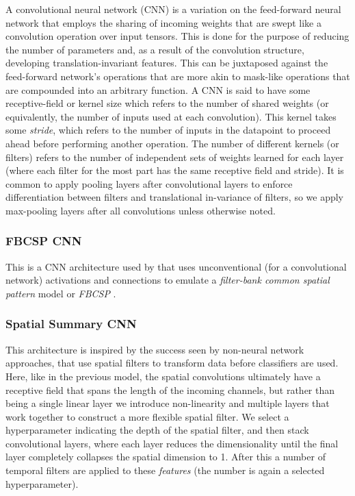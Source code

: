 \documentclass[utf8]{frontiersSCNS} %
\begin{document}
A convolutional neural network (CNN) \cite{LecunnMNIST, GoodfellowTextbook} is a variation on the feed-forward neural network that employs the sharing of incoming weights that are swept like a convolution operation over input tensors. This is done for the purpose of reducing the number of parameters and, as a result of the convolution structure, developing translation-invariant features. This can be juxtaposed against the feed-forward network's operations that are more akin to mask-like operations that are compounded into an arbitrary function. A CNN is said to have some receptive-field or kernel size which refers to the number of shared weights (or equivalently, the number of inputs used at each convolution). This kernel takes some {\em stride}, which refers to the number of inputs in the datapoint to proceed ahead before performing another operation. The number of different kernels (or filters) refers to the number of independent sets of weights learned for each layer (where each filter for the most part has the same receptive field and stride). It is common to apply pooling layers \cite{} after convolutional layers to enforce differentiation between filters and translational in-variance of filters, so we apply max-pooling \cite{} layers after all convolutions unless otherwise noted.

\subsubsection{FBCSP CNN}

This is a CNN architecture used by \cite{Schirrmeister2017} that uses unconventional (for a convolutional network) activations and connections to emulate a \emph{filter-bank common spatial pattern} model or \emph{FBCSP} \cite{KaiKengAng2008}.  

\subsubsection{Spatial Summary CNN} \label{sec:scnn}

This architecture is inspired by the success seen by non-neural network approaches, that use spatial filters to transform data before classifiers are used. Here, like in the previous model, the spatial convolutions ultimately have a receptive field that spans the length of the incoming channels, but rather than being a single linear layer we introduce non-linearity and multiple layers that work together to construct a more flexible spatial filter. We select a hyperparameter indicating the depth of the spatial filter, and then stack convolutional layers, where each layer reduces the dimensionality until the final layer completely collapses the spatial dimension to 1. After this a number of temporal filters are applied to these {\em features} (the number is again a selected hyperparameter).
\end{document}
